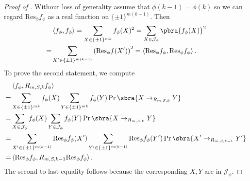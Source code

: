 \begin{proof}[Proof of ]
    Without loss of generality assume that $\phi(k-1)=\phi(k)$ so we can regard $\mathrm{Res}_\phi f_\phi$ as a real function on $\{\pm1\}^{m(k-1)}$. Then
    \begin{align*}
        &\left\langle f_\phi,f_\phi\right\rangle 
        =\sum_{X\in\{\pm1\}^{mk}}f_\phi(X)^2
        = \sum_{X\in \mathcal{J}_\phi}\pbra{{f_\phi(X)}}^2\\
        =& \sum_{X'\in \{\pm1\}^{m(k-1)}}\left(\mathrm{Res}_\phi f(X')\right)^2
        = \left\langle \mathrm{Res}_\phi f_\phi , \mathrm{Res}_\phi f_\phi \right\rangle.
    \end{align*}
    To prove the second statement, we compute
    \begin{align*}
        &\left\langle f_\phi,R_{m,S,k}f_\phi\right\rangle\\
        =&\sum_{X\in\{\pm1\}^{mk}}f_\phi(X)\sum_{Y\in\{\pm1\}^{mk}}f_\phi(Y)\Pr\sbra{X\to_{R_{m,S,k}} Y}\\
        =&\sum_{X\in\mathcal{J}_\phi}f_\phi(X)\sum_{Y\in\mathcal{J}_\phi}f_\phi(Y)\Pr\sbra{X\to_{R_{m,S,k}} Y}\\
        =&\sum_{X'\in\{\pm1\}^{m(k-1)}}\mathrm{Res}_\phi f_\phi(X')\sum_{Y'\in\{\pm1\}^{m(k-1)}}\mathrm{Res}_\phi f_\phi(Y')\Pr\sbra{X'\to_{R_{m,S,k-1}} Y'}\\
        =&\left\langle \mathrm{Res}_\phi f_\phi ,R_{m,S,k-1}\mathrm{Res}_\phi f_\phi  \right\rangle.
    \end{align*}
    The second-to-last equality follows because the corresponding $X,Y$ are in $\mathcal{J}_\phi$.
\end{proof}

